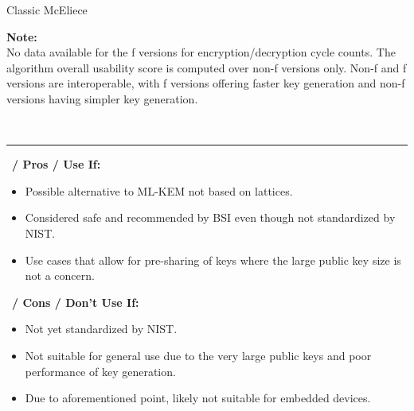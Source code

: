 \begin{algorithmbox}{Classic McEliece}
\begin{minipage}[t]{0.6\textwidth}
        {\bfseries Note:}\\
        \normalfont No data available for the f versions for encryption/decryption cycle counts. The algorithm overall usability score is computed over non-f versions only. Non-f and f versions are interoperable, with f versions offering faster key generation and non-f versions having simpler key generation.
    \end{minipage}\\
    \hrule
    \vspace{1\baselineskip}
    \begin{minipage}[t]{0.49\textwidth}
        \scriptsize\faThumbsUp\, {\bfseries / Pros / Use If:}
        \begin{itemize}[leftmargin=*]
            \setlength\itemsep{0em}
            \item Possible alternative to ML-KEM not based on lattices.
            \item Considered safe and recommended by BSI even though not standardized by NIST.
            \item Use cases that allow for pre-sharing of keys where the large public key size is not a concern.
        \end{itemize}
    \end{minipage}
    \hfill
    \begin{minipage}[t]{0.49\textwidth}
        \scriptsize \faThumbsDown\, {\bfseries / Cons / Don't Use If:}
        \begin{itemize}[leftmargin=*]
            \setlength\itemsep{0em}
            \item Not yet standardized by NIST.
            \item Not suitable for general use due to the very large public keys and poor performance of key generation.
            \item Due to aforementioned point, likely not suitable for embedded devices.
        \end{itemize}
    \end{minipage}
\end{algorithmbox}
